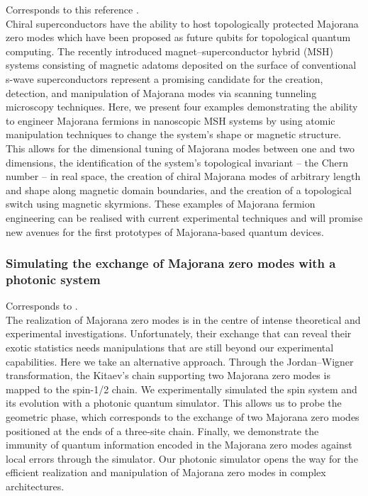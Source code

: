 Corresponds to this reference \cite{2018Mascot}.\\

Chiral superconductors have the ability to host topologically protected Majorana zero modes which have been proposed as future qubits for topological quantum computing. The recently introduced magnet--superconductor hybrid (MSH) systems consisting of magnetic adatoms deposited on the surface of conventional s-wave superconductors represent a promising candidate for the creation, detection, and manipulation of Majorana modes via scanning tunneling microscopy techniques. Here, we present four examples demonstrating the ability to engineer Majorana fermions in nanoscopic MSH systems by using atomic manipulation techniques to change the system's shape or magnetic structure. This allows for the dimensional tuning of Majorana modes between one and two dimensions, the identification of the system's topological invariant -- the Chern number -- in real space, the creation of chiral Majorana modes of arbitrary length and shape along magnetic domain boundaries, and the creation of a topological switch using magnetic skyrmions. These examples of Majorana fermion engineering can be realised with current experimental techniques and will promise new avenues for the first prototypes of Majorana-based quantum devices.

\subsubsection{Simulating the exchange of Majorana zero modes with a photonic system}

Corresponds to \cite{Xu2016}.\\

The realization of Majorana zero modes is in the centre of intense theoretical and experimental investigations. Unfortunately, their exchange that can reveal their exotic statistics needs manipulations that are still beyond our experimental capabilities. Here we take an alternative approach. Through the Jordan–Wigner transformation, the Kitaev's chain supporting two Majorana zero modes is mapped to the spin-1/2 chain. We experimentally simulated the spin system and its evolution with a photonic quantum simulator. This allows us to probe the geometric phase, which corresponds to the exchange of two Majorana zero modes positioned at the ends of a three-site chain. Finally, we demonstrate the immunity of quantum information encoded in the Majorana zero modes against local errors through the simulator. Our photonic simulator opens the way for the efficient realization and manipulation of Majorana zero modes in complex architectures.

